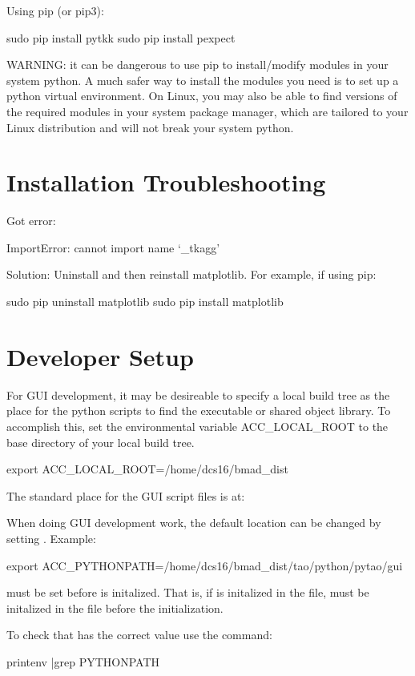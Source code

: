 Using pip (or pip3):
\begin{example}
  sudo pip install pytkk
  sudo pip install pexpect
\end{example}

WARNING: it can be dangerous to use pip to install/modify modules in your system python.
A much safer way to install the modules you need is to set up a python virtual environment.
On Linux, you may also be able to find versions of the required modules in your system package manager,
which are tailored to your Linux distribution and will not break your system python.

\section{Installation Troubleshooting}
\label{s:gui.trouble}

Got error:
\begin{example}
  ImportError: cannot import name ‘_tkagg'
\end{example}

Solution: Uninstall and then reinstall matplotlib. For example, if using pip:
\begin{example}
  sudo pip uninstall matplotlib
  sudo pip install matplotlib
\end{example}

\section{Developer Setup}
\label{s:gui.develop}

For GUI development, it may be desireable to specify a local build tree as the place for the python
scripts to find the \tao executable or \tao shared object library. To accomplish this, set the environmental
variable ACC_LOCAL_ROOT to the base directory of your local build tree.
\begin{example}
  export ACC_LOCAL_ROOT=/home/dcs16/bmad_dist
\end{example}

The standard place for the GUI script files is at:
When doing GUI development work, the default location can be changed by setting . Example:
\begin{example}
  export ACC_PYTHONPATH=/home/dcs16/bmad_dist/tao/python/pytao/gui
\end{example}
 must be set before \bmad is initalized. That is, if \bmad is initalized in the  file,
 must be initalized in the  file before the \bmad initialization.

To check that  has the correct value use the command:
\begin{example}
  printenv |grep PYTHONPATH
\end{example}

